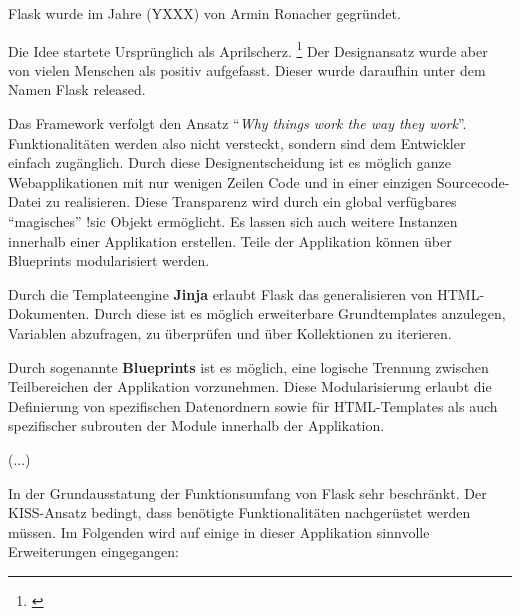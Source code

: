     Flask wurde im Jahre (YXXX) von Armin Ronacher gegründet. 
    
    Die Idee startete Ursprünglich als Aprilscherz. \footnote{\cite{openingtheflask}} Der Designansatz wurde aber von vielen Menschen als positiv aufgefasst. Dieser wurde daraufhin unter dem Namen Flask released.
    
    
    Das Framework verfolgt den Ansatz "`\textit{Why things work the way they work}"'. Funktionalitäten werden also nicht versteckt, sondern sind dem Entwickler einfach zugänglich. Durch diese Designentscheidung ist es möglich ganze Webapplikationen mit nur wenigen Zeilen Code und in einer einzigen Sourcecode-Datei zu realisieren. Diese Transparenz wird durch ein global verfügbares "`magisches"' !sic Objekt ermöglicht. 
    Es lassen sich auch weitere Instanzen innerhalb einer Applikation erstellen. 
    Teile der Applikation können über Blueprints modularisiert werden.
    
   Durch die Templateengine \textbf{Jinja} erlaubt Flask das generalisieren von HTML-Dokumenten. Durch diese ist es möglich erweiterbare Grundtemplates anzulegen, Variablen abzufragen, zu überprüfen und über Kollektionen zu iterieren.
   

   
  Durch sogenannte \textbf{Blueprints} ist es möglich, eine logische Trennung zwischen Teilbereichen der Applikation vorzunehmen. Diese Modularisierung erlaubt die Definierung von spezifischen Datenordnern sowie für HTML-Templates als auch spezifischer subrouten der Module innerhalb der Applikation.
  
  (...)
  

  In der Grundausstatung der Funktionsumfang von Flask sehr beschränkt. Der KISS-Ansatz bedingt, dass benötigte Funktionalitäten nachgerüstet werden müssen. Im Folgenden wird auf einige in dieser Applikation sinnvolle Erweiterungen eingegangen:
  
